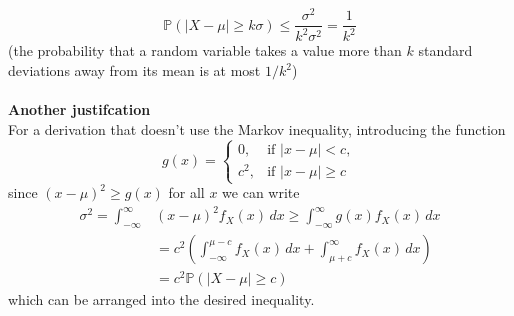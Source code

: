 \documentclass{report}
\begin{document}
\begin{equation*}
\mathbb{P}(|X-\mu|\geq k\sigma)\leq\frac{\sigma^2}{k^2\sigma^2}=\frac{1}{k^2}
\end{equation*}
(the probability that a random variable takes a value more than $k$ standard deviations away from its mean is at 
most $1/k^2$)\\
\vspace{1mm}\\
\textbf{Another justifcation}\\
For a derivation that doesn't use the Markov inequality, introducing the function
\begin{equation*}
g(x)=\begin{cases}
0,&\text{if }|x-\mu|<c,\\
c^2,&\text{if }|x-\mu|\geq c
\end{cases}
\end{equation*}
since $(x-\mu)^2\geq g(x)$ for all $x$ we can write
\begin{align*}
\sigma^2=\int^\infty_{-\infty}&(x-\mu)^2f_X(x)\,dx\geq
\int^\infty_{-\infty}g(x)f_X(x)\,dx\\
&=c^2\left(\int^{\mu-c}_{-\infty}f_X(x)\,dx+\int_{\mu+c}^\infty f_X(x)\,dx\right)\\
&=c^2\mathbb{P}(|X-\mu|\geq c)
\end{align*}
which can be arranged into the desired inequality.
\newpage
\end{document}
